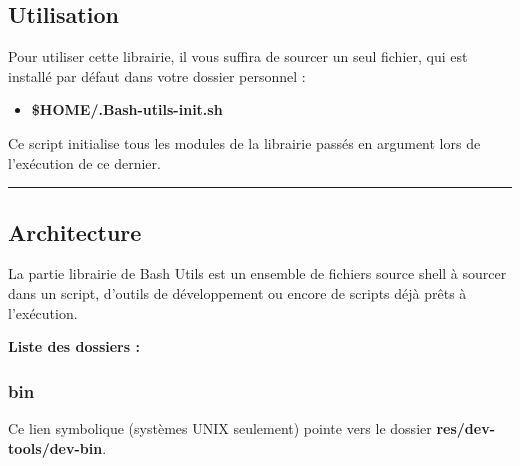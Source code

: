 \documentclass[a4paper,10pt]{article}
\begin{document}
    \color{sec2}
    \subsection{Utilisation}\color{text}

    \begin{justify}
        Pour utiliser cette librairie, il vous suffira de sourcer un seul fichier, qui est installé par défaut dans votre dossier personnel :

        \begin{itemize}
            \item \textbf{\color{vars}\$HOME\color{path}/.Bash-utils-init.sh}
        \end{itemize}
    \end{justify}

    \begin{justify}
        Ce script initialise tous les modules de la librairie passés en argument lors de l'exécution de ce dernier.
    \end{justify}




    \color{sec2}\par\noindent\rule{\textwidth}{0.4pt}\color{text}

    \color{sec2}
    \subsection{Architecture}\color{text}

    \begin{justify}
        La partie librairie de Bash Utils est un ensemble de fichiers source shell à sourcer dans un script, d'outils de développement ou encore de scripts déjà prêts à l'exécution.
    \end{justify}


    \textbf{Liste des dossiers :}

    \color{sec3}
    \subsubsection{bin}\color{text}

    \begin{justify}
        Ce lien symbolique (systèmes UNIX seulement) pointe vers le dossier \textbf{\color{path}res/dev-tools/dev-bin}.
    \end{justify}
\end{document}
